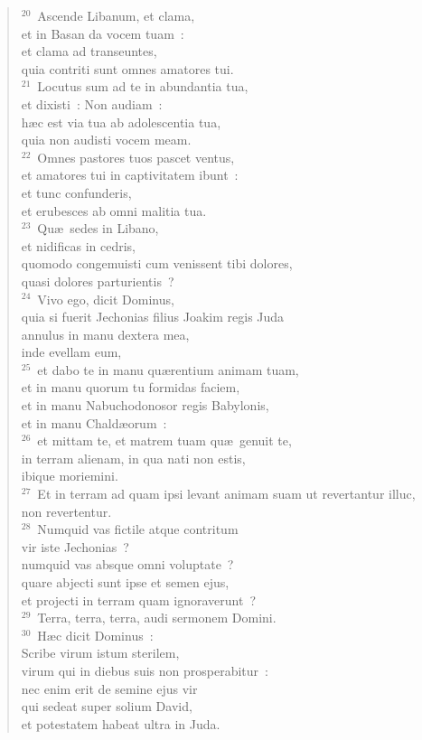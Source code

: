 \begin{verse}${}^{20}$~Ascende Libanum, et clama,\\ et in Basan da vocem tuam~:\\ et clama ad transeuntes,\\ quia contriti sunt omnes amatores tui.\\
${}^{21}$~Locutus sum ad te in abundantia tua,\\ et dixisti~: Non audiam~:\\ h\ae c est via tua ab adolescentia tua,\\ quia non audisti vocem meam.\\
${}^{22}$~Omnes pastores tuos pascet ventus,\\ et amatores tui in captivitatem ibunt~:\\ et tunc confunderis,\\ et erubesces ab omni malitia tua.\\
${}^{23}$~Qu\ae\ sedes in Libano,\\ et nidificas in cedris,\\ quomodo congemuisti cum venissent tibi dolores,\\ quasi dolores parturientis~?\\
${}^{24}$~Vivo ego, dicit Dominus,\\ quia si fuerit Jechonias filius Joakim regis Juda\\ annulus in manu dextera mea,\\ inde evellam eum,\\
${}^{25}$~et dabo te in manu qu\ae rentium animam tuam,\\ et in manu quorum tu formidas faciem,\\ et in manu Nabuchodonosor regis Babylonis,\\ et in manu Chald\ae orum~:\\
${}^{26}$~et mittam te, et matrem tuam qu\ae\ genuit te,\\ in terram alienam, in qua nati non estis,\\ ibique moriemini.\\
${}^{27}$~Et in terram ad quam ipsi levant animam suam ut revertantur illuc,\\ non revertentur.\\
${}^{28}$~Numquid vas fictile atque contritum\\ vir iste Jechonias~?\\ numquid vas absque omni voluptate~?\\ quare abjecti sunt ipse et semen ejus,\\ et projecti in terram quam ignoraverunt~?\\
${}^{29}$~Terra, terra, terra, audi sermonem Domini.\\
${}^{30}$~H\ae c dicit Dominus~:\\ Scribe virum istum sterilem,\\ virum qui in diebus suis non prosperabitur~:\\ nec enim erit de semine ejus vir\\ qui sedeat super solium David,\\ et potestatem habeat ultra in Juda.\end{verse}


